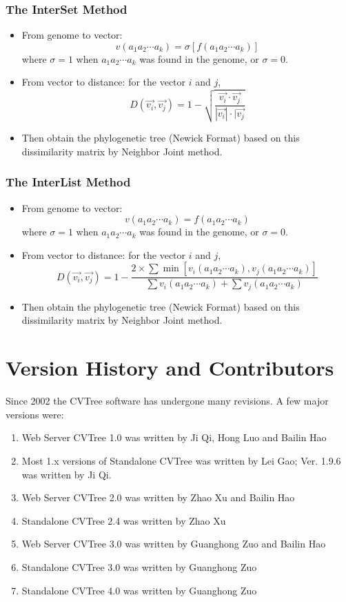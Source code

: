\documentclass[a4paper,12pt]{article}
\begin{document}
\subsubsection{The InterSet Method} 
\begin{itemize}
  \item From genome to vector: $$v(a_1 a_2 \cdots a_k) = \sigma [f(a_1a_2 \cdots a_k)]$$ 
  where $\sigma = 1$ when $a_1a_2\cdots a_k$ was found in the genome, or $\sigma = 0$.
  \item From vector to distance: for the vector $i$ and $j$, 
  $$D(\vec{v_i},\vec{v_j})= 1 -\sqrt{\frac{\vec{v_i} 
  \cdot \vec{v_j}}{|\vec{v_i}| \cdot |\vec{v_j}}}$$
  \item Then obtain the phylogenetic tree (Newick Format) based on this
  dissimilarity matrix by Neighbor Joint method.
\end{itemize}

\subsubsection{The InterList Method} 
\begin{itemize}
  \item From genome to vector: $$v(a_1a_2\cdots a_k)= f(a_1a_2 \cdots a_k)$$ 
  where $\sigma = 1$ when $a_1a_2\cdots a_k$ was found in the genome, or $\sigma = 0$.
  \item From vector to distance: for the vector $i$ and $j$, 
  $$D(\vec{v_i},\vec{v_j})= 1-\frac{2 \times \sum \min[v_i(a_1a_2\cdots a_k), 
  v_j(a_1a_2\cdots a_k)]}{\sum v_i(a_1a_2\cdots a_k) + \sum v_j(a_1a_2\cdots a_k)}$$
  \item Then obtain the phylogenetic tree (Newick Format) based on this
  dissimilarity matrix by Neighbor Joint method.
\end{itemize}

\section{Version History and Contributors}

Since 2002 the CVTree software has undergone many revisions. A few major
versions were:
\begin{enumerate}\itemsep 0pt
\item Web Server CVTree 1.0 was written by Ji Qi, Hong Luo and Bailin Hao
\item Most 1.x versions of Standalone CVTree was written by Lei Gao;
  Ver. 1.9.6 was written by Ji Qi.
\item Web Server CVTree 2.0 was written by Zhao Xu and Bailin Hao
\item Standalone CVTree 2.4 was written by Zhao Xu
\item Web Server CVTree 3.0 was written by Guanghong Zuo and Bailin Hao
\item Standalone CVTree 3.0 was written by Guanghong Zuo
\item Standalone CVTree 4.0 was written by Guanghong Zuo
\end{enumerate}
\end{document}
